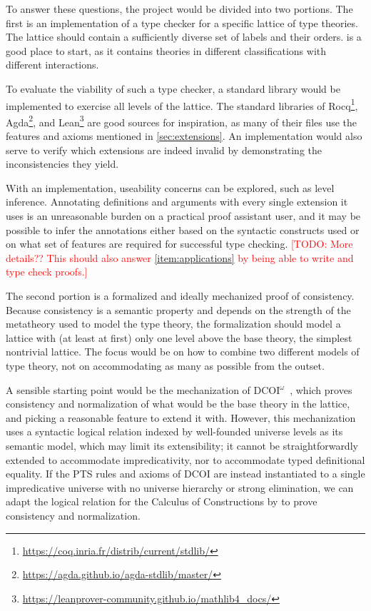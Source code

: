 \documentclass{article}
\newcommand{\note}[1]{\textcolor{red}{[#1]}}
\begin{document}
To answer these questions, the project would be divided into two portions.
The first is an implementation of a type checker for a specific lattice of type theories.
The lattice should contain a sufficiently diverse set of labels and their orders.
 is a good place to start,
as it contains theories in different classifications with different interactions.

To evaluate the viability of such a type checker,
a standard library would be implemented to exercise all levels of the lattice.
The standard libraries of Rocq\footnote{\url{https://coq.inria.fr/distrib/current/stdlib/}},
Agda\footnote{\url{https://agda.github.io/agda-stdlib/master/}},
and Lean\footnote{\url{https://leanprover-community.github.io/mathlib4_docs/}}
are good sources for inspiration,
as many of their files use the features and axioms mentioned in \cref{sec:extensions}.
An implementation would also serve to verify which extensions are indeed invalid
by demonstrating the inconsistencies they yield.

With an implementation, useability concerns can be explored,
such as level inference.
Annotating definitions and arguments with every single extension it uses
is an unreasonable burden on a practical proof assistant user,
and it may be possible to infer the annotations
either based on the syntactic constructs used
or on what set of features are required for successful type checking.
\note{TODO: More details?? This should also answer \cref{item:applications}
by being able to write and type check proofs.}

The second portion is a formalized and ideally mechanized proof of consistency.
Because consistency is a semantic property and depends on the strength
of the metatheory used to model the type theory,
the formalization should model a lattice with (at least at first)
only one level above the base theory, the simplest nontrivial lattice.
The focus would be on how to combine two different models of type theory,
not on accommodating as many as possible from the outset.

A sensible starting point would be the mechanization of DCOI$^\omega$~\cite{dcoi-omega},
which proves consistency and normalization of what would be the base theory in the lattice,
and picking a reasonable feature to extend it with.
However, this mechanization uses a syntactic logical relation
indexed by well-founded universe levels as its semantic model,
which may limit its extensibility;
it cannot be straightforwardly extended to accommodate impredicativity,
nor to accommodate typed definitional equality.
If the PTS rules and axioms of DCOI are instead instantiated to
a single impredicative universe with no universe hierarchy or strong elimination,
we can adapt the logical relation for the Calculus of Constructions by \citet{cc}
to prove consistency and normalization.
\end{document}
